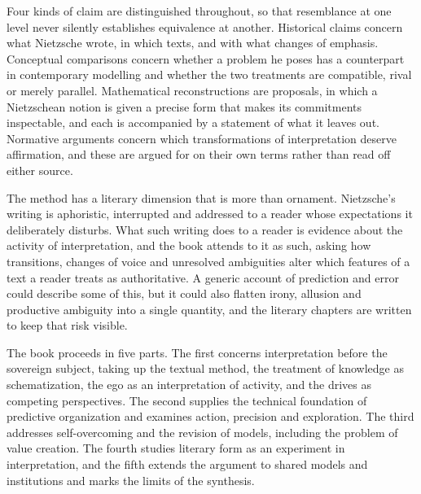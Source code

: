 Four kinds of claim are distinguished throughout, so that resemblance at one level never silently establishes equivalence at another. Historical claims concern what Nietzsche wrote, in which texts, and with what changes of emphasis. Conceptual comparisons concern whether a problem he poses has a counterpart in contemporary modelling and whether the two treatments are compatible, rival or merely parallel. Mathematical reconstructions are proposals, in which a Nietzschean notion is given a precise form that makes its commitments inspectable, and each is accompanied by a statement of what it leaves out. Normative arguments concern which transformations of interpretation deserve affirmation, and these are argued for on their own terms rather than read off either source.

The method has a literary dimension that is more than ornament. Nietzsche's writing is aphoristic, interrupted and addressed to a reader whose expectations it deliberately disturbs. What such writing does to a reader is evidence about the activity of interpretation, and the book attends to it as such, asking how transitions, changes of voice and unresolved ambiguities alter which features of a text a reader treats as authoritative. A generic account of prediction and error could describe some of this, but it could also flatten irony, allusion and productive ambiguity into a single quantity, and the literary chapters are written to keep that risk visible.

The book proceeds in five parts. The first concerns interpretation before the sovereign subject, taking up the textual method, the treatment of knowledge as schematization, the ego as an interpretation of activity, and the drives as competing perspectives. The second supplies the technical foundation of predictive organization and examines action, precision and exploration. The third addresses self-overcoming and the revision of models, including the problem of value creation. The fourth studies literary form as an experiment in interpretation, and the fifth extends the argument to shared models and institutions and marks the limits of the synthesis.
